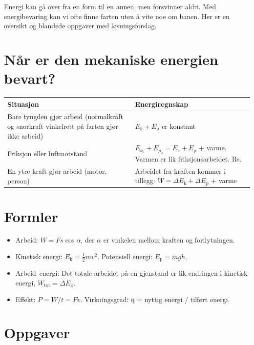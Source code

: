 \documentclass[11pt]{article}
\begin{document}

Energi kan gå over fra en form til en annen, men forsvinner aldri. Med energibevaring kan vi ofte finne farten uten å vite noe om banen. Her er en oversikt og blandede oppgaver med løsningsforslag.

\section*{Når er den mekaniske energien bevart?}

\begin{center}\small
\begin{tabularx}{\linewidth}{YY}
\toprule
\textbf{Situasjon} & \textbf{Energiregnskap} \\
\midrule
Bare tyngden gjør arbeid (normalkraft og snorkraft vinkelrett på farten gjør ikke arbeid) & $E_{\mathrm{k}} + E_{\mathrm{p}}$ er konstant \\
Friksjon eller luftmotstand & $E_{k_{0}} + E_{p_{0}} = E_{\mathrm{k}} + E_{\mathrm{p}}$ + varme. Varmen er lik friksjonsarbeidet, Rs. \\
En ytre kraft gjør arbeid (motor, person) & Arbeidet fra kraften kommer i tillegg: $W = ΔE_{\mathrm{k}} + ΔE_{\mathrm{p}}$ + varme \\
\bottomrule
\end{tabularx}
\end{center}

\section*{Formler}

\begin{itemize}
\item Arbeid: $W = Fs \cos  α$, der $α$ er vinkelen mellom kraften og forflytningen.
\item Kinetisk energi: $E_{\mathrm{k}} = \tfrac{1}{2}mv^{2}$. Potensiell energi: $E_{\mathrm{p}} = mgh$.
\item Arbeid–energi: Det totale arbeidet på en gjenstand er lik endringen i kinetisk energi, $W_{\mathrm{tot}} = ΔE_{\mathrm{k}}$.
\item Effekt: $P = W/t = Fv$. Virkningsgrad: η = nyttig energi / tilført energi.
\end{itemize}

\section*{Oppgaver}
\end{document}
